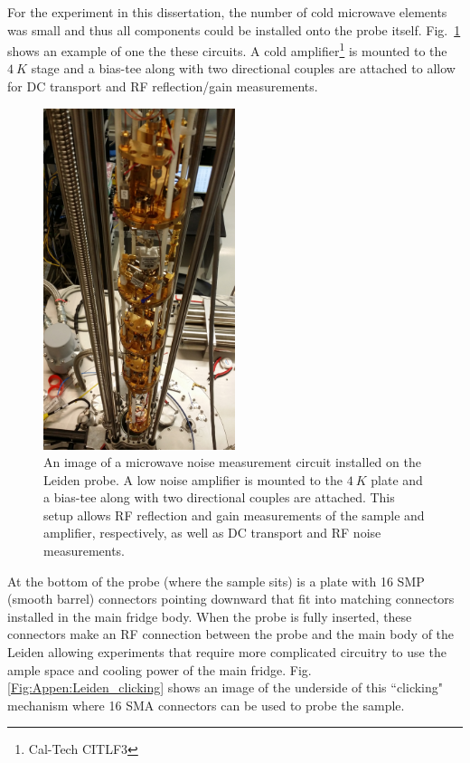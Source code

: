 For the experiment in this dissertation, the number of cold microwave elements was small and thus all components could be installed onto the probe itself. Fig.~\ref{Fig:Appen:Leiden_probe} shows an example of one the these circuits. A cold amplifier\footnote{Cal-Tech CITLF$3$} is mounted to the $4~K$ stage and a bias-tee along with two directional couples are attached to allow for DC transport and RF reflection/gain measurements.

\begin{figure}
\centering
\includegraphics[angle=-90,width = 0.5\textwidth]{figures/appendix/cryostats/Leiden_probe.jpg}
\caption{An image of a microwave noise measurement circuit installed on the Leiden probe. A low noise amplifier is mounted to the $4~K$ plate and a bias-tee along with two directional couples are attached. This setup allows RF reflection and gain measurements of the sample and amplifier, respectively, as well as DC transport and RF noise measurements.}
\label{Fig:Appen:Leiden_probe}
\end{figure}

At the bottom of the probe (where the sample sits) is a plate with 16 SMP (smooth barrel) connectors pointing downward that fit into matching connectors installed in the main fridge body. When the probe is fully inserted, these connectors make an RF connection between the probe and the main body of the Leiden allowing experiments that require more complicated circuitry to use the ample space and cooling power of the main fridge. Fig. \ref{Fig:Appen:Leiden_clicking} shows an image of the underside of this ``clicking" mechanism where 16 SMA connectors can be used to probe the sample.

